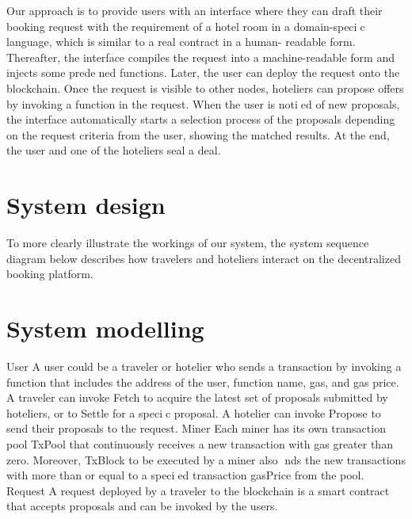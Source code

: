 \documentclass{KERauth}
\begin{document}
Our approach is to provide users with an interface where they can draft their booking request with the
requirement of a hotel room in a domain-specic language, which is similar to a real contract in a human-
readable form. Thereafter, the interface compiles the request into a machine-readable form and injects some
predened functions. Later, the user can deploy the request onto the blockchain. Once the request is visible
to other nodes, hoteliers can propose offers by invoking a function in the request. When the user is notied
of new proposals, the interface automatically starts a selection process of the proposals depending on the
request criteria from the user, showing the matched results. At the end, the user and one of the hoteliers seal
a deal.

\section{System design}
To more clearly illustrate the workings of our system, the system sequence diagram below describes
how travelers and hoteliers interact on the decentralized booking platform.

\section{System modelling}
User A user could be a traveler or hotelier who sends a transaction by invoking a function that includes
the address of the user, function name, gas, and gas price. A traveler can invoke Fetch to acquire the latest
set of proposals submitted by hoteliers, or to Settle for a specic proposal. A hotelier can invoke Propose
to send their proposals to the request.
Miner Each miner has its own transaction pool TxPool that continuously receives a new transaction with
gas greater than zero. Moreover, TxBlock to be executed by a miner also nds the new transactions with
more than or equal to a specied transaction gasPrice from the pool.
Request A request deployed by a traveler to the blockchain is a smart contract that accepts proposals
and can be invoked by the users.
\end{document}
